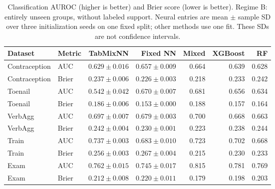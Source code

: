 \begin{table}[htbp]
\centering
\small
\caption{Classification AUROC (higher is better) and Brier score (lower is better). Regime B: entirely unseen groups, without labeled support. Neural entries are mean $\pm$ sample SD over three initialization seeds on one fixed split; other methods use one fit. These SDs are not confidence intervals.}
\label{tab:classification_B}
\begin{tabular}{llrrrrr}
\toprule
Dataset & Metric & TabMixNN & Fixed NN & Mixed & XGBoost & RF \\
\midrule
Contraception & AUC & $0.629 \pm 0.016$ & $0.657 \pm 0.009$ & 0.664 & 0.639 & 0.628 \\
Contraception & Brier & $0.237 \pm 0.006$ & $0.226 \pm 0.003$ & 0.218 & 0.233 & 0.242 \\
Toenail & AUC & $0.542 \pm 0.042$ & $0.670 \pm 0.007$ & 0.681 & 0.656 & 0.634 \\
Toenail & Brier & $0.186 \pm 0.006$ & $0.153 \pm 0.000$ & 0.188 & 0.157 & 0.164 \\
VerbAgg & AUC & $0.697 \pm 0.007$ & $0.679 \pm 0.003$ & 0.700 & 0.668 & 0.663 \\
VerbAgg & Brier & $0.242 \pm 0.004$ & $0.230 \pm 0.001$ & 0.223 & 0.238 & 0.244 \\
Train & AUC & $0.737 \pm 0.003$ & $0.683 \pm 0.010$ & 0.723 & 0.702 & 0.668 \\
Train & Brier & $0.256 \pm 0.003$ & $0.267 \pm 0.004$ & 0.215 & 0.230 & 0.233 \\
Exam & AUC & $0.762 \pm 0.015$ & $0.745 \pm 0.017$ & 0.815 & 0.781 & 0.769 \\
Exam & Brier & $0.212 \pm 0.008$ & $0.220 \pm 0.011$ & 0.179 & 0.198 & 0.203 \\
\bottomrule
\end{tabular}
\end{table}
